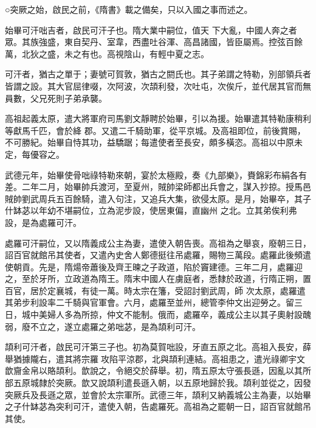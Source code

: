 
\begin{pinyinscope}

 ○突厥之始，啟民之前，《隋書》載之備矣，只以入國之事而述之。



 始畢可汗咄吉者，啟民可汗子也。隋大業中嗣位，值天
 下大亂，中國人奔之者眾。其族強盛，東自契丹、室韋，西盡吐谷渾、高昌諸國，皆臣屬焉。控弦百餘萬，北狄之盛，未之有也。高視陰山，有輕中夏之志。



 可汗者，猶古之單于；妻號可賀敦，猶古之閼氏也。其子弟謂之特勒，別部領兵者皆謂之設。其大官屈律啜，次阿波，次頡利發，次吐屯，次俟斤，並代居其官而無員數，父兄死則子弟承襲。



 高祖起義太原，遣大將軍府司馬劉文靜聘於始畢，引以為援。始畢遣其特勒康稍利等獻馬千匹，會於絳
 郡。又遣二千騎助軍，從平京城。及高祖即位，前後賞賜，不可勝紀。始畢自恃其功，益驕踞；每遣使者至長安，頗多橫恣。高祖以中原未定，每優容之。



 武德元年，始畢使骨咄祿特勒來朝，宴於太極殿，奏《九部樂》，賚錦彩布絹各有差。二年二月，始畢帥兵渡河，至夏州，賊帥梁師都出兵會之，謀入抄掠。授馬邑賊帥劉武周兵五百餘騎，遣入句注，又追兵大集，欲侵太原。是月，始畢卒，其子什缽苾以年幼不堪嗣位，立為泥步設，使居東偏，直幽州
 之北。立其弟俟利弗設，是為處羅可汗。



 處羅可汗嗣位，又以隋義成公主為妻，遣使入朝告喪。高祖為之舉哀，廢朝三日，詔百官就館吊其使者，又遣內史舍人鄭德挺往吊處羅，賜物三萬段。處羅此後頻遣使朝貢。先是，隋煬帝蕭後及齊王暕之子政道，陷於竇建德。三年二月，處羅迎之，至於牙所，立政道為隋王。隋末中國人在虜庭者，悉隸於政道，行隋正朔，置百官，居於定襄城，有徒一萬。時太宗在籓，受詔討劉武周，師
 次太原，處羅遣其弟步利設率二千騎與官軍會。六月，處羅至並州，總管李仲文出迎勞之。留三日，城中美婦人多為所掠，仲文不能制。俄而，處羅卒，義成公主以其子奧射設醜弱，廢不立之，遂立處羅之弟咄苾，是為頡利可汗。



 頡利可汗者，啟民可汗第三子也。初為莫賀咄設，牙直五原之北。高祖入長安，薛舉猶據隴右，遣其將宗羅攻陷平涼郡，北與頡利連結。高祖患之，遣光祿卿宇文
 歆齎金帛以賂頡利。歆說之，令絕交於薛舉。初，隋五原太守張長遜，因亂以其所部五原城隸於突厥。歆又說頡利遣長遜入朝，以五原地歸於我。頡利並從之，因發突厥兵及長遜之眾，並會於太宗軍所。武德三年，頡利又納義城公主為妻，以始畢之子什缽苾為突利可汗，遣使入朝，告處羅死。高祖為之罷朝一日，詔百官就館吊其使。




\end{pinyinscope}
